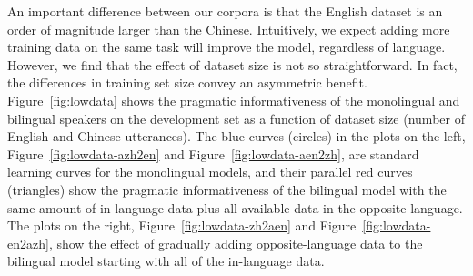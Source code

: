 \documentclass[11pt,a4paper]{article}
\renewcommand{\|}{\mid}
\newcommand{\figref}[1]{Figure~\ref{#1}}
\newcommand{\Figref}[1]{Figure~\ref{#1}}
\begin{document}
An important difference between our corpora is that the English dataset is an order of magnitude larger than the Chinese. Intuitively, we expect adding more training data on the same task will
improve the model, regardless of language. However, we find that the effect of dataset size is not so straightforward. In fact, the differences in training set size convey an asymmetric benefit.
\Figref{fig:lowdata} shows the pragmatic informativeness of the monolingual and bilingual speakers on the development set
as a function of dataset size (number of English and Chinese utterances). The blue curves (circles) in the plots on the left, 
\figref{fig:lowdata-azh2en} and \figref{fig:lowdata-aen2zh}, are standard learning curves for the monolingual 
models, and their parallel red curves (triangles) show the pragmatic informativeness of the bilingual model with the
same amount of in-language data plus all available data in the opposite language. The plots on the right, 
\figref{fig:lowdata-zh2aen} and \figref{fig:lowdata-en2azh}, show the effect of gradually adding 
opposite-language data to the bilingual model starting with all of the in-language data.
\end{document}
